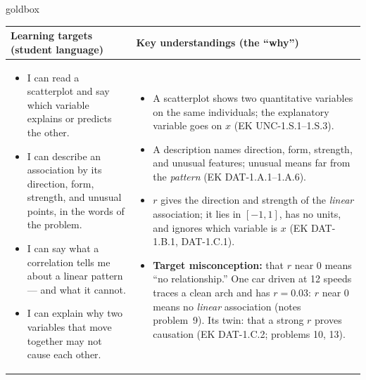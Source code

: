 \documentclass[10pt]{article}
\begin{document}
\renewcommand{\arraystretch}{1.4}
\boxguard
\begin{skillbox}{goldbox}
\begin{tabularx}{\linewidth}{@{}X|X@{}}
\textbf{Learning targets (student language)} & \textbf{Key understandings (the ``why'')} \\[2pt]
\hline
\vspace{-6pt}
\begin{itemize}[leftmargin=1.1em, nosep, after=\vspace{2pt}]
  \item I can read a scatterplot and say which variable explains or predicts the other.
  \item I can describe an association by its direction, form, strength, and unusual points,
        in the words of the problem.
  \item I can say what a correlation tells me about a linear pattern --- and what it cannot.
  \item I can explain why two variables that move together may not cause each other.
\end{itemize}
&
\vspace{-6pt}
\begin{itemize}[leftmargin=1.1em, nosep, after=\vspace{2pt}]
  \item A scatterplot shows two quantitative variables on the same individuals; the
        explanatory variable goes on $x$ (EK UNC-1.S.1--1.S.3).
  \item A description names direction, form, strength, and unusual features; unusual means
        far from the \emph{pattern} (EK DAT-1.A.1--1.A.6).
  \item $r$ gives the direction and strength of the \emph{linear} association; it lies in
        $[-1, 1]$, has no units, and ignores which variable is $x$ (EK DAT-1.B.1, DAT-1.C.1).
  \item \textbf{Target misconception:} that $r$ near 0 means ``no relationship.'' One car
        driven at 12 speeds traces a clean arch and has $r = 0.03$: $r$ near 0 means no
        \emph{linear} association (notes problem~9). Its twin: that a strong $r$ proves
        causation (EK DAT-1.C.2; problems 10, 13).
\end{itemize}
\end{tabularx}
\end{skillbox}
\end{document}
